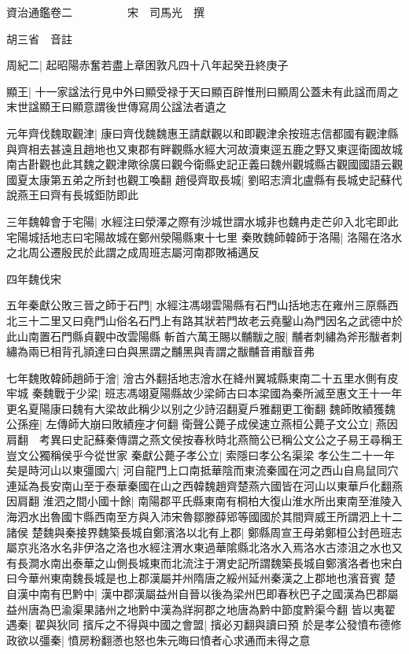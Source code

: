 資治通鑑卷二　　　　　宋　司馬光　撰

胡三省　音註

周紀二|{
	起昭陽赤奮若盡上章困敦凡四十八年起癸丑終庚子}


顯王|{
	十一家諡法行見中外曰顯受禄于天曰顯百辟惟刑曰顯周公蓋未有此諡而周之末世諡顯王曰顯意謂後世傳寫周公諡法者遺之}


元年齊伐魏取觀津|{
	康曰齊伐魏魏惠王請獻觀以和即觀津余按班志信都國有觀津縣與齊相去甚遠且趙地也又東郡有畔觀縣水經大河故瀆東逕五鹿之野又東逕衛國故城南古卙觀也此其魏之觀津歟徐廣曰觀今衛縣史記正義曰魏州觀城縣古觀國國語云觀國夏太康第五弟之所封也觀工喚翻}
趙侵齊取長城|{
	劉昭志濟北盧縣有長城史記蘇代說燕王曰齊有長城鉅防即此}


三年魏韓會于宅陽|{
	水經注曰滎澤之際有沙城世謂水城非也魏冉走芒卯入北宅即此宅陽城括地志曰宅陽故城在鄭州滎陽縣東十七里}
秦敗魏師韓師于洛陽|{
	洛陽在洛水之北周公遷殷民於此謂之成周班志屬河南郡敗補邁反}


四年魏伐宋

五年秦獻公敗三晉之師于石門|{
	水經注馮翊雲陽縣有石門山括地志在雍州三原縣西北三十二里又曰堯門山俗名石門上有路其狀若門故老云堯鑿山為門因名之武德中於此山南置石門縣貞觀中改雲陽縣}
斬首六萬王賜以黼黻之服|{
	黼者刺繡為斧形黻者刺繡為兩已相背孔頴達曰白與黑謂之黼黑與青謂之黻黼音甫黻音弗}


七年魏敗韓師趙師于澮|{
	澮古外翻括地志澮水在絳州翼城縣東南二十五里水側有皮牢城}
秦魏戰于少梁|{
	班志馮翊夏陽縣故少梁師古曰本梁國為秦所滅至惠文王十一年更名夏陽康曰魏有大梁故此稱少以别之少詩沼翻夏戶雅翻更工衡翻}
魏師敗績獲魏公孫痤|{
	左傳師大崩曰敗績痤才何翻}
衛聲公薨子成侯速立燕桓公薨子文公立|{
	燕因肩翻　考異曰史記蘇秦傳謂之燕文侯按春秋時北燕簡公已稱公文公之子易王尋稱王豈文公獨稱侯乎今從世家}
秦獻公薨子孝公立|{
	索隱曰孝公名渠梁}
孝公生二十一年矣是時河山以東彊國六|{
	河自龍門上口南抵華陰而東流秦國在河之西山自鳥鼠同穴連延為長安南山至于泰華秦國在山之西韓魏趙齊楚燕六國皆在河山以東華戶化翻燕因肩翻}
淮泗之間小國十餘|{
	南陽郡平氏縣東南有桐柏大復山淮水所出東南至淮陵入海泗水出魯國卞縣西南至方與入沛宋魯鄒滕薛郳等國國於其間齊威王所謂泗上十二諸侯}
楚魏與秦接界魏築長城自鄭濱洛以北有上郡|{
	鄭縣周宣王母弟鄭桓公封邑班志屬京兆洛水名非伊洛之洛也水經注渭水東過華隂縣北洛水入焉洛水古漆沮之水也又有長澗水南出泰華之山側長城東而北流注于渭史記所謂魏築長城自鄭濱洛者也宋白曰今華州東南魏長城是也上郡漢屬并州隋唐之綏州延州秦漢之上郡地也濱音賓}
楚自漢中南有巴黔中|{
	漢中郡漢屬益州自晉以後為梁州巴即春秋巴子之國漢為巴郡屬益州唐為巴渝渠果諸州之地黔中漢為牂牁郡之地唐為黔中節度黔渠今翻}
皆以夷翟遇秦|{
	翟與狄同}
擯斥之不得與中國之會盟|{
	擯必刃翻與讀曰預}
於是孝公發憤布德修政欲以彊秦|{
	憤房粉翻懣也怒也朱元晦曰憤者心求通而未得之意}


